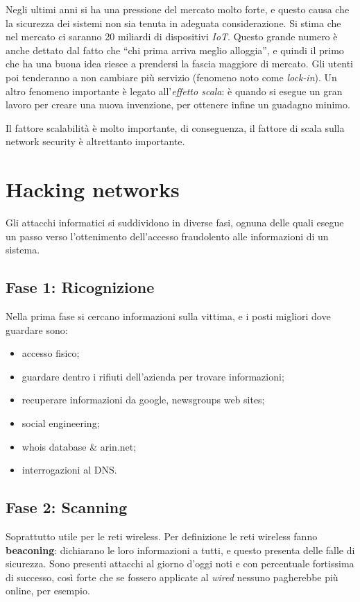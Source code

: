 Negli ultimi anni si ha una pressione del mercato molto forte, e questo causa
che la sicurezza dei sistemi non sia tenuta in adeguata considerazione. Si
stima che nel mercato ci saranno 20 miliardi di dispositivi \textit{IoT}.
Questo grande numero è anche dettato dal fatto che ``chi prima arriva meglio
alloggia'', e quindi il primo che ha una buona idea riesce a prendersi la
fascia maggiore di mercato. Gli utenti poi tenderanno a non cambiare più
servizio (fenomeno noto come \textit{lock-in}). Un altro fenomeno
importante è legato all'\textit{effetto scala}: è quando si esegue un gran
lavoro per creare una nuova invenzione, per ottenere infine un guadagno minimo.

Il fattore scalabilità è molto importante, di conseguenza, il fattore di scala
sulla network security è altrettanto importante.

\section{Hacking networks}

Gli attacchi informatici si suddividono in diverse fasi, ognuna delle quali
esegue un passo verso l'ottenimento dell'accesso fraudolento alle informazioni
di un sistema.


\subsection{Fase 1: Ricognizione}

Nella prima fase si cercano informazioni sulla vittima, e i posti migliori dove
guardare sono:
\begin{itemize}
 \item accesso fisico;
 \item guardare dentro i rifiuti dell'azienda per trovare informazioni;
 \item recuperare informazioni da google, newsgroups web sites;
 \item social engineering;
 \item whois database \& arin.net;
 \item interrogazioni al DNS.
\end{itemize}

\subsection{Fase 2: Scanning}

Soprattutto utile per le reti wireless. Per definizione le reti wireless fanno
\textbf{beaconing}: dichiarano le loro informazioni a tutti, e questo presenta
delle falle di sicurezza. Sono presenti attacchi al giorno d'oggi noti e con
percentuale fortissima di successo, così forte che se fossero applicate al
\textit{wired} nessuno pagherebbe più online, per esempio.

